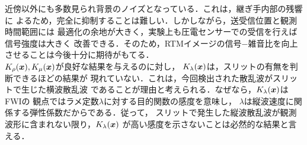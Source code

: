 近傍以外にも多数見られ背景のノイズとなっている．これは，継ぎ手内部の残響に
よるため，完全に抑制することは難しい．しかしながら，送受信位置と観測時間範囲には
最適化の余地が大きく，実験上も圧電センサーでの受信を行えば信号強度は大きく
改善できる．そのため，RTMイメージの信号−雑音比を向上させることは今後十分に期待がもてる．
\\
\hspace{\parindent}
$K_\rho(\boldsymbol{x}), K_\mu(\boldsymbol{x})$が良好な結果を与えるのに対し，
$K_\lambda(\boldsymbol{x})$は，スリットの有無を判断できるほどの結果が
現れていない．これは，今回検出された散乱波がスリットで生じた横波散乱波
であることが理由と考えられる．なぜなら，$K_{\lambda}(\boldsymbol{x})$はFWIの
観点ではラメ定数$\lambda$に対する目的関数の感度を意味し，
$\lambda$は縦波速度に関係する弾性係数だからである．従って，
スリットで発生した縦波散乱波が観測波形に含まれない限り，$K_\lambda(\boldsymbol{x})$
が高い感度を示さないことは必然的な結果と言える．

